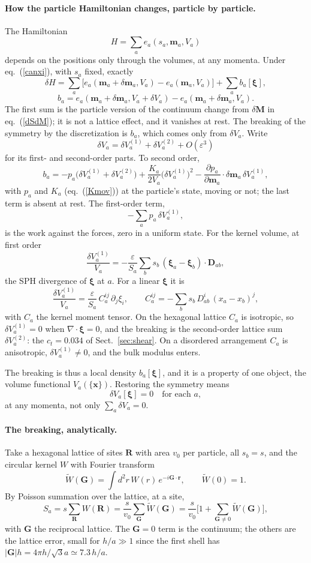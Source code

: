 \documentclass[11pt,aps,preprint,nofootinbib,superscriptaddress,tightenlines]{revtex4-2}
\def\st{\begin{equation}}
\def\stp{\end{equation}}
\def\Eq#1{eq.~(\ref{#1})}
\def\Sect#1{Sect.~\ref{#1}}
\let\oldparagraph\paragraph
\renewcommand{\paragraph}{\par\bigskip\oldparagraph}
\begin{document}
\paragraph{How the particle Hamiltonian changes, particle by particle.}  The Hamiltonian
\st
H=\sum_ae_a(s_a,\bm m_a,V_a)
\stp
depends on the positions only through the volumes, at any momenta.  Under \Eq{canxi}, with
$s_a$ fixed, exactly
\st
\delta H=\sum_a\big[e_a(\bm m_a+\delta\bm m_a,V_a)-e_a(\bm m_a,V_a)\big]+\sum_ab_a[\bm\xi],
\label{dHsplit}
\stp
\st
b_a=e_a(\bm m_a+\delta\bm m_a,V_a+\delta V_a)-e_a(\bm m_a+\delta\bm m_a,V_a).
\stp
The first sum is the particle version of the continuum change from $\delta\bm M$ in
\Eq{dSdM}; it is not a lattice effect, and it vanishes at rest.  The breaking of the
symmetry by the discretization is $b_a$, which comes only from $\delta V_a$.  Write
\st
\delta V_a=\delta V_a^{(1)}+\delta V_a^{(2)}+O(\varepsilon^3)
\stp
for its first- and second-order parts.  To second order,
\st
b_a=-p_a\big(\delta V_a^{(1)}+\delta V_a^{(2)}\big)+\frac{K_a}{2V_a}\big(\delta V_a^{(1)}\big)^2
-\frac{\partial p_a}{\partial\bm m_a}\cdot\delta\bm m_a\,\delta V_a^{(1)} ,
\label{ba}
\stp
with $p_a$ and $K_a$ (\Eq{Kmov}) at the particle's state, moving or not; the last term is
absent at rest.  The first-order term,
\st
-\sum_ap_a\,\delta V_a^{(1)} ,
\stp
is the work against the forces, zero in a uniform state.  For the kernel volume, at first
order
\st
\frac{\delta V_a^{(1)}}{V_a}=-\frac{\varepsilon}{S_a}\sum_bs_b\,(\bm\xi_a-\bm\xi_b)\cdot\bm D_{ab},
\stp
the SPH divergence of $\bm\xi$ at $a$.  For a linear $\bm\xi$ it is
\st
\frac{\delta V_a^{(1)}}{V_a}=\frac{\varepsilon}{S_a}\,C_a^{ij}\,\partial_j\xi_i ,\qquad
C_a^{ij}=-\sum_bs_b\,D^i_{ab}\,(x_a-x_b)^j ,
\stp
with $C_a$ the kernel moment tensor.  On the hexagonal lattice $C_a$ is isotropic, so
$\delta V_a^{(1)}=0$ when $\nabla\cdot\bm\xi=0$, and the breaking is the second-order
lattice sum $\delta V_a^{(2)}$: the $c_t=0.034$ of \Sect{sec:shear}.  On a disordered
arrangement $C_a$ is anisotropic, $\delta V_a^{(1)}\neq0$, and the bulk modulus enters.

The breaking is thus a local density $b_a[\bm\xi]$, and it is a property of one object, the
volume functional $V_a(\{\bm x\})$.  Restoring the symmetry means
\st
\delta V_a[\bm\xi]=0\quad\text{for each }a ,
\label{dVzero}
\stp
at any momenta, not only $\sum_a\delta V_a=0$.

\paragraph{The breaking, analytically.}  Take a hexagonal lattice of sites $\bm R$ with area
$v_0$ per particle, all $s_b=s$, and the circular kernel $W$ with Fourier transform
\st
\tilde W(\bm G)=\int d^2r\,W(r)\,e^{-i\bm G\cdot\bm r},\qquad \tilde W(0)=1 .
\stp
By Poisson summation over the lattice, at a site,
\st
S_a=s\sum_{\bm R}W(\bm R)=\frac{s}{v_0}\sum_{\bm G}\tilde W(\bm G)
=\frac{s}{v_0}\Big[1+\sum_{\bm G\neq0}\tilde W(\bm G)\Big],
\label{poisson}
\stp
with $\bm G$ the reciprocal lattice.  The $\bm G=0$ term is the continuum; the others are the
lattice error, small for $h/a\gg1$ since the first shell has $|\bm G|h=4\pi h/\sqrt3a\simeq7.3\,h/a$.
\end{document}
